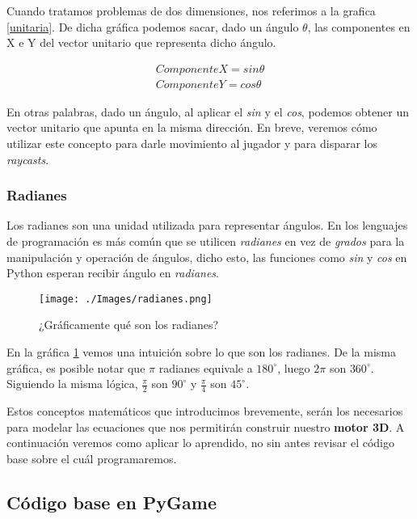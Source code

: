 Cuando tratamos problemas de dos dimensiones, nos referimos a la grafica \ref{unitaria}. De dicha gráfica podemos sacar, dado un ángulo $\theta$, las componentes en X e Y del vector unitario que representa dicho ángulo.

\begin{equation}
\begin{aligned}
\label{unitvector}
ComponenteX = sin \theta \\
ComponenteY = cos \theta
\end{aligned}
\end{equation}

En otras palabras, dado un ángulo, al aplicar el \emph{sin} y el \emph{cos}, podemos obtener un vector unitario que apunta en la misma dirección. En breve, veremos cómo utilizar este concepto para darle movimiento al jugador y para disparar los \emph{raycasts}.

\subsubsection{Radianes}

Los radianes son una unidad utilizada para representar ángulos. En los lenguajes de programación es más común que se utilicen \emph{radianes} en vez de \emph{grados} para la manipulación y operación de ángulos, dicho esto, las funciones como \emph{sin} y \emph{cos} en Python esperan recibir ángulo en \emph{radianes}. 

\begin{figure}[h!]
	\centering
	\texttt{[image: ./Images/radianes.png]}
	\caption{¿Gráficamente qué son los radianes?}
	\label{rads}
\end{figure}

En la gráfica \ref{rads} vemos una intuición sobre lo que son los radianes. De la misma gráfica, es posible notar que $\pi$ radianes equivale a $180^{\circ}
$, luego $2\pi$ son $360^{\circ}$. Siguiendo la misma lógica, $\frac{\pi}{2}$ son  $90^{\circ}$ y $\frac{\pi}{4}$ son  $45^{\circ}$.


Estos conceptos matemáticos que introducimos brevemente, serán los necesarios para modelar las ecuaciones que nos permitirán construir nuestro \textbf{motor 3D}. A continuación veremos como aplicar lo aprendido, no sin antes revisar el código base sobre el cuál programaremos.


\subsection{Código base en PyGame}

